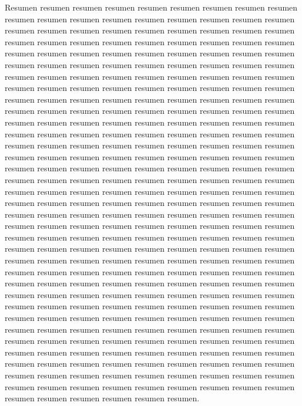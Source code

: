 Resumen resumen resumen resumen resumen resumen resumen resumen resumen resumen resumen resumen resumen resumen resumen resumen resumen resumen resumen resumen resumen resumen resumen resumen resumen resumen resumen resumen resumen resumen resumen resumen resumen resumen resumen resumen resumen resumen resumen resumen resumen resumen resumen resumen resumen resumen resumen resumen resumen resumen resumen resumen resumen resumen resumen resumen resumen resumen resumen resumen resumen resumen resumen resumen resumen resumen resumen resumen resumen resumen resumen resumen resumen resumen resumen resumen resumen resumen resumen resumen resumen resumen resumen resumen resumen resumen resumen resumen resumen resumen resumen resumen resumen resumen resumen resumen resumen resumen resumen resumen resumen resumen resumen resumen resumen resumen resumen resumen resumen resumen resumen resumen resumen resumen resumen resumen resumen resumen resumen resumen resumen resumen resumen resumen resumen resumen resumen resumen resumen resumen resumen resumen resumen resumen resumen resumen resumen resumen resumen resumen resumen resumen resumen resumen resumen resumen resumen resumen resumen resumen resumen resumen resumen resumen resumen resumen resumen resumen resumen resumen resumen resumen resumen resumen resumen resumen resumen resumen resumen resumen resumen resumen resumen resumen resumen resumen resumen resumen resumen resumen resumen resumen resumen resumen resumen resumen resumen resumen resumen resumen resumen resumen resumen resumen resumen resumen resumen resumen resumen resumen resumen resumen resumen resumen resumen resumen resumen resumen resumen resumen resumen resumen resumen resumen resumen resumen resumen resumen resumen resumen resumen resumen resumen resumen resumen resumen resumen resumen resumen resumen resumen resumen resumen resumen resumen resumen resumen resumen resumen resumen resumen resumen resumen resumen resumen resumen resumen resumen resumen resumen resumen resumen resumen resumen resumen resumen resumen resumen resumen resumen resumen resumen resumen resumen resumen resumen resumen resumen resumen resumen resumen resumen resumen resumen resumen resumen resumen resumen resumen resumen resumen resumen resumen resumen resumen resumen resumen resumen resumen resumen resumen resumen resumen resumen resumen resumen resumen resumen resumen resumen resumen resumen resumen resumen resumen resumen resumen resumen resumen resumen resumen resumen.


